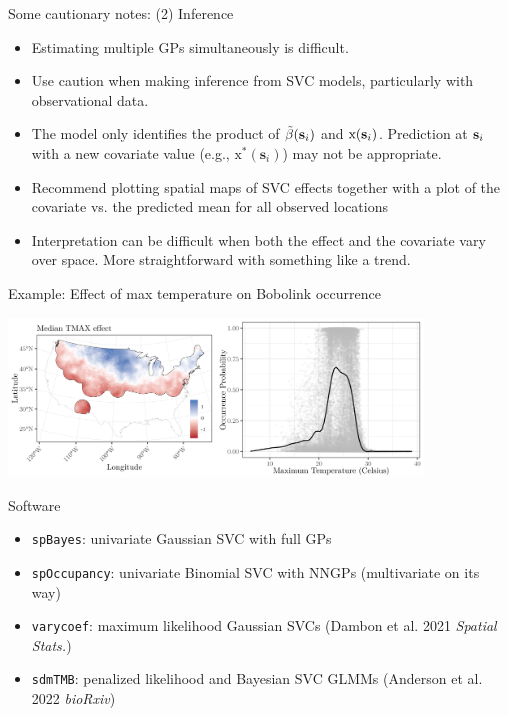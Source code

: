 \begin{frame}{Some cautionary notes: (2) Inference}
	\begin{itemize}
             \item Estimating multiple GPs simultaneously is difficult.
	     \item Use caution when making inference from SVC models, particularly with observational data. \pause
	     \item The model only identifies the product of $\tilde{\beta}(\textbf{s}_i)$ and $\text{x}(\textbf{s}_i)$. Prediction at $\textbf{s}_i$ with a new covariate value (e.g., $\text{x}^\ast(\bm{s}_i)$) may not be appropriate. \pause
	     \item Recommend plotting spatial maps of SVC effects together with a plot of the covariate vs. the predicted mean for all observed locations
	     \item Interpretation can be difficult when both the effect and the covariate vary over space. More straightforward with something like a trend.
	\end{itemize}
\end{frame}

\begin{frame}{Example: Effect of max temperature on Bobolink occurrence}

\begin{center}
   \includegraphics[width=11cm]{../figures/svc-bobolink.png}
\end{center}

\end{frame}

\begin{frame}{Software}

\begin{itemize}
    \item \texttt{spBayes}: univariate Gaussian SVC with full GPs
    \item \texttt{spOccupancy}: univariate Binomial SVC with NNGPs (multivariate on its way)
    \item \texttt{varycoef}: maximum likelihood Gaussian SVCs (Dambon et al. 2021 \textit{Spatial Stats.})
    \item \texttt{sdmTMB}: penalized likelihood and Bayesian SVC GLMMs (Anderson et al. 2022 \textit{bioRxiv})
\end{itemize}

\end{frame}

